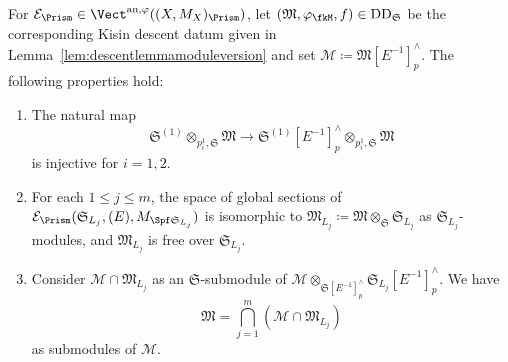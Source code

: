 \begin{lem} \label{lem:properties-analy-prism-F-crystal}
For $\mathcal{E}_\Prism \in \Vect^{\mathrm{an},\varphi}((X,M_X)_\Prism)$, let $(\mathfrak{M}, \varphi_\fkM, f) \in \mathrm{DD}_{\mathfrak{S}}$ be the corresponding Kisin descent datum given in Lemma~\ref{lem:descentlemmamoduleversion} and set $\mathcal{M} \coloneqq \mathfrak{M}[E^{-1}]^{\wedge}_p$. The following properties hold:
\begin{enumerate}
    \item The natural map
    \[
    \mathfrak{S}^{(1)}\otimes_{p^1_i, \mathfrak{S}} \mathfrak{M} \rightarrow \mathfrak{S}^{(1)}[E^{-1}]^{\wedge}_p\otimes_{p^1_i, \mathfrak{S}} \mathfrak{M}
    \]
    is injective for $i = 1, 2$.
    
    \item For each $1 \leq j \leq m$, the space of global sections of $\mathcal{E}_\Prism(\mathfrak{S}_{L_j}, (E), M_{\Spf \mathfrak{S}_{L_j}})$ is isomorphic to $\mathfrak{M}_{L_j}\coloneqq\mathfrak{M}\otimes_{\mathfrak{S}} \mathfrak{S}_{L_j}$ as $\mathfrak{S}_{L_j}$-modules, and $\mathfrak{M}_{L_j}$ is free over $\mathfrak{S}_{L_j}$.  

    \item Consider $\mathcal{M} \cap \mathfrak{M}_{L_j}$ as an $\mathfrak{S}$-submodule of $\mathcal{M}\otimes_{\mathfrak{S}[E^{-1}]^{\wedge}_p} \mathfrak{S}_{L_j}[E^{-1}]^{\wedge}_p$. We have
    \[
    \mathfrak{M} = \bigcap_{j = 1}^m (\mathcal{M} \cap \mathfrak{M}_{L_j})
    \]
    as submodules of $\mathcal{M}$.
\end{enumerate}
\end{lem}


